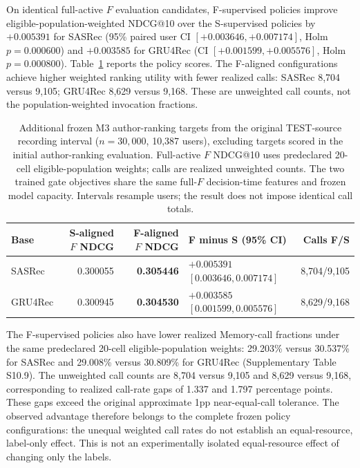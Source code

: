 On identical full-active $F$ evaluation candidates, F-supervised policies improve eligible-population-weighted NDCG@10 over the S-supervised policies by $+0.005391$ for SASRec (95\% paired user CI $[+0.003646,+0.007174]$, Holm $p=0.000600$) and $+0.003585$ for GRU4Rec (CI $[+0.001599,+0.005576]$, Holm $p=0.000800$). Table~\ref{tab:results-m3-b4a-supervision} reports the policy scores. The F-aligned configurations achieve higher weighted ranking utility with fewer realized calls: SASRec 8,704 versus 9,105; GRU4Rec 8,629 versus 9,168. These are unweighted call counts, not the population-weighted invocation fractions.

\begin{table}[!htbp]
\centering
\caption{Additional frozen M3 author-ranking targets from the original TEST-source recording interval ($n=30{,}000$, 10,387 users), excluding targets scored in the initial author-ranking evaluation. Full-active $F$ NDCG@10 uses predeclared 20-cell eligible-population weights; calls are realized unweighted counts. The two trained gate objectives share the same full-$F$ decision-time features and frozen model capacity. Intervals resample users; the result does not impose identical call totals.}
\label{tab:results-m3-b4a-supervision}
\footnotesize
\setlength{\tabcolsep}{4pt}
\begin{tabularx}{\textwidth}{@{}lrrXr@{}}
\toprule
Base & S-aligned $F$ NDCG & F-aligned $F$ NDCG & F minus S (95\% CI) & Calls F/S \\
\midrule
SASRec & 0.300055 & \textbf{0.305446} & $+0.005391$ $[0.003646,0.007174]$ & 8,704/9,105 \\
GRU4Rec & 0.300945 & \textbf{0.304530} & $+0.003585$ $[0.001599,0.005576]$ & 8,629/9,168 \\
\bottomrule
\end{tabularx}
\end{table}

The F-supervised policies also have lower realized Memory-call fractions under the same predeclared 20-cell eligible-population weights: 29.203\% versus 30.537\% for SASRec and 29.008\% versus 30.809\% for GRU4Rec (Supplementary Table S10.9). The unweighted call counts are 8,704 versus 9,105 and 8,629 versus 9,168, corresponding to realized call-rate gaps of 1.337 and 1.797 percentage points. These gaps exceed the original approximate 1pp near-equal-call tolerance. The observed advantage therefore belongs to the complete frozen policy configurations: the unequal weighted call rates do not establish an equal-resource, label-only effect. This is not an experimentally isolated equal-resource effect of changing only the labels.

